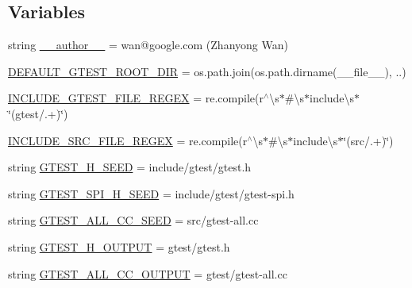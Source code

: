 \subsection*{Variables}
\begin{DoxyCompactItemize}
\item 
string \hyperlink{namespacefuse__gtest__files_a33bf00338164b922cf67f159e3cded19}{\+\_\+\+\_\+author\+\_\+\+\_\+} = \textquotesingle{}wan@google.\+com (Zhanyong Wan)\textquotesingle{}
\item 
\hyperlink{namespacefuse__gtest__files_a68085bdb2912baa7e71d2b3eb37b05c9}{D\+E\+F\+A\+U\+L\+T\+\_\+\+G\+T\+E\+S\+T\+\_\+\+R\+O\+O\+T\+\_\+\+D\+IR} = os.\+path.\+join(os.\+path.\+dirname(\+\_\+\+\_\+file\+\_\+\+\_\+), \textquotesingle{}..\textquotesingle{})
\item 
\hyperlink{namespacefuse__gtest__files_ad7abe9bfa06bb1c5411e8b4a7a686e5b}{I\+N\+C\+L\+U\+D\+E\+\_\+\+G\+T\+E\+S\+T\+\_\+\+F\+I\+L\+E\+\_\+\+R\+E\+G\+EX} = re.\+compile(r\textquotesingle{}$^\wedge$\textbackslash{}s$\ast$\#\textbackslash{}s$\ast$include\textbackslash{}s$\ast$\char`\"{}(gtest/.+)\char`\"{}\textquotesingle{})
\item 
\hyperlink{namespacefuse__gtest__files_aec4e054d0ab27276d6150468bb98a8a4}{I\+N\+C\+L\+U\+D\+E\+\_\+\+S\+R\+C\+\_\+\+F\+I\+L\+E\+\_\+\+R\+E\+G\+EX} = re.\+compile(r\textquotesingle{}$^\wedge$\textbackslash{}s$\ast$\#\textbackslash{}s$\ast$include\textbackslash{}s$\ast$\char`\"{}(src/.+)\char`\"{}\textquotesingle{})
\item 
string \hyperlink{namespacefuse__gtest__files_ad897bce28100f2b97216929013519181}{G\+T\+E\+S\+T\+\_\+\+H\+\_\+\+S\+E\+ED} = \textquotesingle{}include/gtest/gtest.\+h\textquotesingle{}
\item 
string \hyperlink{namespacefuse__gtest__files_a891d03ce9cfe3577cb4c193f9544f17f}{G\+T\+E\+S\+T\+\_\+\+S\+P\+I\+\_\+\+H\+\_\+\+S\+E\+ED} = \textquotesingle{}include/gtest/gtest-\/spi.\+h\textquotesingle{}
\item 
string \hyperlink{namespacefuse__gtest__files_a162a6031d0d5743a37a4f79227d5e916}{G\+T\+E\+S\+T\+\_\+\+A\+L\+L\+\_\+\+C\+C\+\_\+\+S\+E\+ED} = \textquotesingle{}src/gtest-\/all.\+cc\textquotesingle{}
\item 
string \hyperlink{namespacefuse__gtest__files_a16437f87d0f7a9800885a9082a0b773e}{G\+T\+E\+S\+T\+\_\+\+H\+\_\+\+O\+U\+T\+P\+UT} = \textquotesingle{}gtest/gtest.\+h\textquotesingle{}
\item 
string \hyperlink{namespacefuse__gtest__files_aa66c14474599109c46ec24eaa0ad4217}{G\+T\+E\+S\+T\+\_\+\+A\+L\+L\+\_\+\+C\+C\+\_\+\+O\+U\+T\+P\+UT} = \textquotesingle{}gtest/gtest-\/all.\+cc\textquotesingle{}
\end{DoxyCompactItemize}



